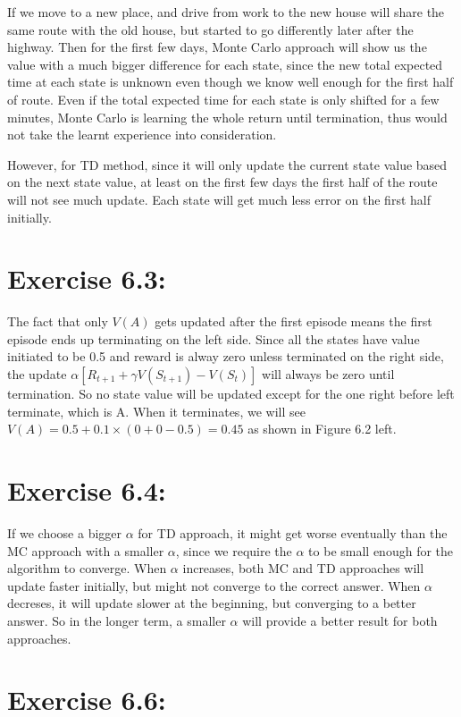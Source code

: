 \documentclass[10pt,letterpaper]{article}
\begin{document}
If we move to a new place, and drive from work to the new house will share the same route with the old house, but started to go differently later after the highway. Then for the first few days, Monte Carlo approach will show us the value with a much bigger difference for each state, since the new total expected time at each state is unknown even though we know well enough for the first half of route. Even if the total expected time for each state is only shifted for a few minutes, Monte Carlo is learning the whole return until termination, thus would not take the learnt experience into consideration.

However, for TD method, since it will only update the current state value based on the next state value, at least on the first few days the first half of the route will not see much update. Each state will get much less error on the first half initially.

\section*{Exercise 6.3: }
\label{6.3}

The fact that only $V(A)$ gets updated after the first episode means the first episode ends up terminating on the left side. Since all the states have value initiated to be 0.5 and reward is alway zero unless terminated on the right side, the update $\alpha[R_{t+1} + \gamma V(S_{t+1}) - V(S_t)]$ will always be zero until termination. So no state value will be updated except for the one right before left terminate, which is A. When it terminates, we will see $V(A) = 0.5 + 0.1\times(0 + 0 - 0.5) = 0.45$ as shown in Figure 6.2 left. 


\section*{Exercise 6.4: }
\label{6.4}

If we choose a bigger $\alpha$ for TD approach, it might get worse eventually than the MC approach with a smaller $\alpha$, since we require the $\alpha$ to be small enough for the algorithm to converge. When $\alpha$ increases, both MC and TD approaches will update faster initially, but might not converge to the correct answer. When $\alpha$ decreses, it will update slower at the beginning, but converging to a better answer. So in the longer term, a smaller $\alpha$ will provide a better result for both approaches.


\section*{Exercise 6.6: }
\label{6.6}
\end{document}
